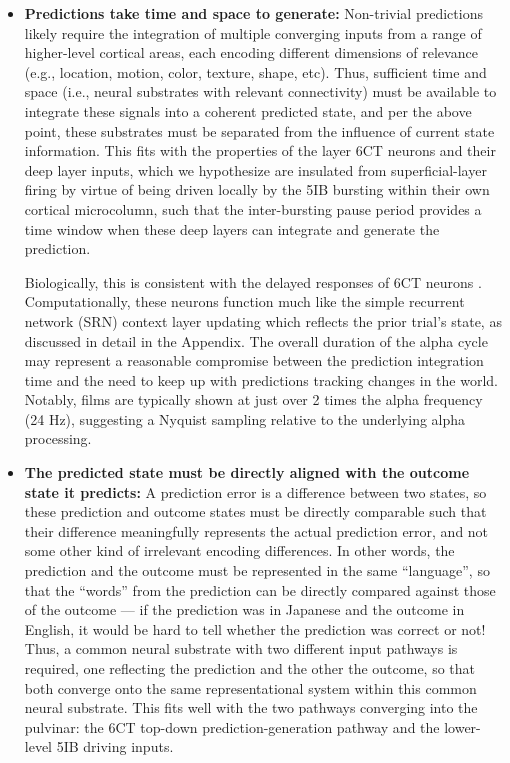 \documentclass[11pt,twoside]{article}
\newif\myifpdf
\begin{document}
\begin{itemize}
	\item {\bf Predictions take time and space to generate:} Non-trivial predictions likely require the integration of multiple converging inputs from a range of higher-level cortical areas, each encoding different dimensions of relevance (e.g., location, motion, color, texture, shape, etc).  Thus, sufficient time and space (i.e., neural substrates with relevant connectivity) must be available to integrate these signals into a coherent predicted state, and per the above point, these substrates must be separated from the influence of current state information.  This fits with the properties of the layer 6CT neurons and their deep layer inputs, which we hypothesize are insulated from superficial-layer firing by virtue of being driven locally by the 5IB bursting within their own cortical microcolumn, such that the inter-bursting pause period provides a time window when these deep layers can integrate and generate the prediction.
	
	Biologically, this is consistent with the delayed responses of 6CT neurons \citep{HarrisShepherd15,SakataHarris09,Thomson10}.  Computationally, these neurons function much like the simple recurrent network (SRN) context layer updating \citep{Elman90,Jordan89} which reflects the prior trial's state, as discussed in detail in the Appendix.  The overall duration of the alpha cycle may represent a reasonable compromise between the prediction integration time and the need to keep up with predictions tracking changes in the world.  Notably, films are typically shown at just over 2 times the alpha frequency (24 Hz), suggesting a Nyquist sampling relative to the underlying alpha processing.

	\item {\bf The predicted state must be directly aligned with the outcome state it predicts:} A prediction error is a difference between two states, so these prediction and outcome states must be directly comparable such that their difference meaningfully represents the actual prediction error, and not some other kind of irrelevant encoding differences.  In other words, the prediction and the outcome must be represented in the same ``language'', so that the ``words'' from the prediction can be directly compared against those of the outcome --- if the prediction was in Japanese and the outcome in English, it would be hard to tell whether the prediction was correct or not!  Thus, a common neural substrate with two different input pathways is required, one reflecting the prediction and the other the outcome, so that both converge onto the same representational system within this common neural substrate.  This fits well with the two pathways converging into the pulvinar: the 6CT top-down prediction-generation pathway and the lower-level 5IB driving inputs.


\end{itemize}
\end{document}
